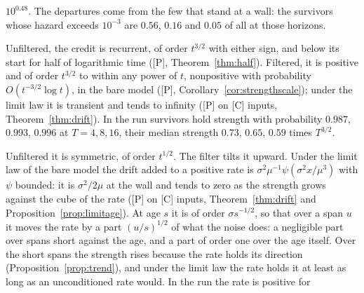 \begin{description}
$10^{0.48}$. The departures come from the few that stand at a wall: the
survivors whose hazard exceeds $10^{-3}$ are $0.56$, $0.16$ and
$0.05$ of all at those horizons.
\item[The strength.] Unfiltered, the credit is recurrent, of order
$t^{3/2}$ with either sign, and below its start for half of logarithmic
time ([P], Theorem~\ref{thm:half}). Filtered, it is positive and of order $t^{3/2}$ to
within any power of $t$, nonpositive with probability
$O(t^{-3/2}\log t)$, in the bare model ([P], Corollary~\ref{cor:strengthscale}); under the
limit law it is transient and tends to infinity ([P] on [C] inputs, Theorem~\ref{thm:drift}). In the
run survivors hold strength with probability $0.987$, $0.993$, $0.996$
at $T=4,8,16$, their median strength $0.73$, $0.65$, $0.59$ times
$T^{3/2}$.
\item[The strength's rate.] Unfiltered it is symmetric, of order
$t^{1/2}$. The filter tilts it upward. Under the limit law of the bare
model the drift added to a positive rate is
$\sigma^2\mu^{-1}\psi(\sigma^2x/\mu^3)$ with $\psi$ bounded: it is
$\sigma^2/2\mu$ at the wall and tends to zero as the strength grows
against the cube of the rate ([P] on [C] inputs, Theorem~\ref{thm:drift} and
Proposition~\ref{prop:limitage}). At age $s$ it is of order $\sigma s^{-1/2}$, so that over a
span $u$ it moves the rate by a part $(u/s)^{1/2}$ of what the noise
does: a negligible part over spans short against the age, and a part of
order one over the age itself. Over the short spans the strength rises
because the rate holds its direction (Proposition~\ref{prop:trend}), and under the limit law
the rate holds it at least as long as an unconditioned rate would. In the
run the rate is positive for

\end{description}
